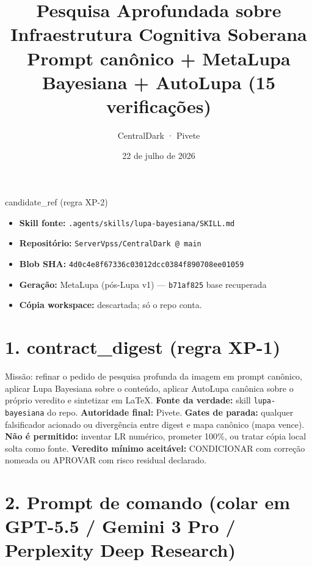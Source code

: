 \documentclass[11pt,a4paper]{article}
\title{\textbf{Pesquisa Aprofundada sobre Infraestrutura Cognitiva Soberana}\\
\large Prompt canônico + MetaLupa Bayesiana + AutoLupa (15 verificações)}
\author{CentralDark · Pivete}
\date{22 de julho de 2026}
\begin{document}
\maketitle

\begin{bloco}{candidate\_ref (regra XP-2)}
\begin{itemize}[leftmargin=1.4em]
  \item \textbf{Skill fonte:} \texttt{.agents/skills/lupa-bayesiana/SKILL.md}
  \item \textbf{Repositório:} \texttt{ServerVpss/CentralDark @ main}
  \item \textbf{Blob SHA:} \texttt{4d0c4e8f67336c03012dcc0384f890708ee01059}
  \item \textbf{Geração:} MetaLupa (pós-Lupa v1) --- \texttt{b71af825} base recuperada
  \item \textbf{Cópia workspace:} descartada; só o repo conta.
\end{itemize}
\end{bloco}

\section*{1. contract\_digest (regra XP-1)}

Missão: refinar o pedido de pesquisa profunda da imagem em prompt
canônico, aplicar Lupa Bayesiana sobre o conteúdo, aplicar AutoLupa
canônica sobre o próprio veredito e sintetizar em LaTeX.
\textbf{Fonte da verdade:} skill \texttt{lupa-bayesiana} do repo.
\textbf{Autoridade final:} Pivete. \textbf{Gates de parada:} qualquer
falsificador acionado ou divergência entre digest e mapa canônico
(mapa vence). \textbf{Não é permitido:} inventar LR numérico,
prometer 100\%, ou tratar cópia local solta como fonte.
\textbf{Veredito mínimo aceitável:} CONDICIONAR com correção nomeada
ou APROVAR com risco residual declarado.

\section*{2. Prompt de comando (colar em GPT-5.5 / Gemini 3 Pro / Perplexity Deep Research)}
\end{document}
